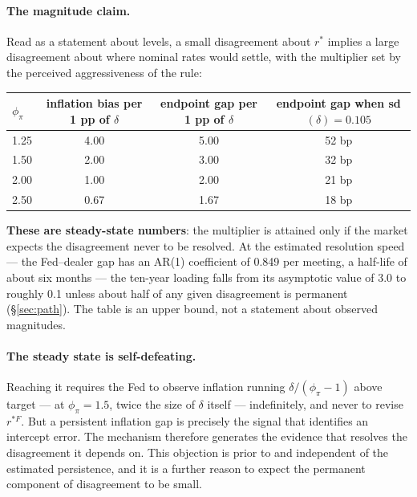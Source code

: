 \documentclass[11pt]{article}
\begin{document}
\paragraph{The magnitude claim.} Read as a statement about levels, a small
disagreement about $r^{*}$ implies a large disagreement about where nominal rates would settle,
with the multiplier set by the perceived aggressiveness of the rule:
\begin{center}\small
\begin{tabular}{lccc}
\toprule
$\phi_\pi$ & inflation bias per 1 pp of $\delta$ & endpoint gap per 1 pp of $\delta$ & endpoint gap when sd$(\delta)=0.105$\\ \midrule
1.25 & 4.00 & 5.00 & 52 bp\\
1.50 & 2.00 & 3.00 & 32 bp\\
2.00 & 1.00 & 2.00 & 21 bp\\
2.50 & 0.67 & 1.67 & 18 bp\\
\bottomrule\end{tabular}
\end{center}
\noindent \textbf{These are steady-state numbers}: the multiplier is attained only if the
market expects the disagreement never to be resolved. At the estimated resolution speed --- the
Fed--dealer gap has an AR(1) coefficient of 0.849 per meeting, a half-life of about six
months --- the ten-year loading falls from its asymptotic value of 3.0 to roughly 0.1 unless
about half of any given disagreement is permanent (\S\ref{sec:path}). The table is an upper
bound, not a statement about observed magnitudes.
\paragraph{The steady state is self-defeating.} Reaching it requires the Fed to observe
inflation running $\delta/(\phi_\pi-1)$ above target --- at $\phi_\pi=1.5$, twice the size of
$\delta$ itself --- indefinitely, and never to revise $r^{*F}$. But a persistent inflation gap
is precisely the signal that identifies an intercept error. The mechanism therefore generates
the evidence that resolves the disagreement it depends on. This objection is prior to and
independent of the estimated persistence, and it is a further reason to expect the permanent
component of disagreement to be small.
\end{document}

